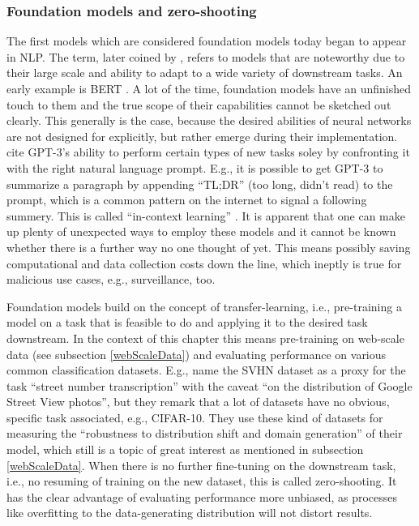 \documentclass[
]{krantz}
\begin{document}
\hypertarget{foundMod}{%
\subsubsection{Foundation models and zero-shooting}\label{foundMod}}

The first models which are considered foundation models today began to appear in NLP.
The term, later coined by \citet{bommasani2021opportunities}, refers to models that are noteworthy due to their large scale and ability to adapt to a wide variety of downstream tasks.
An early example is BERT \citep{Devlin2018}.
A lot of the time, foundation models have an unfinished touch to them and the true scope of their capabilities cannot be sketched out clearly.
This generally is the case, because the desired abilities of neural networks are not designed for explicitly, but rather emerge during their implementation.
\citet{bommasani2021opportunities} cite GPT-3's ability to perform certain types of new tasks soley by confronting it with the right natural language prompt.
E.g., it is possible to get GPT-3 to summarize a paragraph by appending ``TL;DR'' (too long, didn't read) to the prompt, which is a common pattern on the internet to signal a following summery.
This is called ``in-context learning'' \citep{brown2020language}.
It is apparent that one can make up plenty of unexpected ways to employ these models and it cannot be known whether there is a further way no one thought of yet.
This means possibly saving computational and data collection costs down the line, which ineptly is true for malicious use cases, e.g., surveillance, too.

Foundation models build on the concept of transfer-learning, i.e., pre-training a model on a task that is feasible to do and applying it to the desired task downstream.
In the context of this chapter this means pre-training on web-scale data (see subsection \ref{webScaleData}) and evaluating performance on various common classification datasets.
E.g., \citet{radford2021learning} name the SVHN dataset as a proxy for the task ``street number transcription'' with the caveat ``on the distribution of Google Street View photos'', but they remark that a lot of datasets have no obvious, specific task associated, e.g., CIFAR-10.
They use these kind of datasets for measuring the ``robustness to distribution shift and domain generation'' of their model, which still is a topic of great interest as mentioned in subsection \ref{webScaleData}.
When there is no further fine-tuning on the downstream task, i.e., no resuming of training on the new dataset, this is called zero-shooting.
It has the clear advantage of evaluating performance more unbiased, as processes like overfitting to the data-generating distribution will not distort results.
\end{document}

